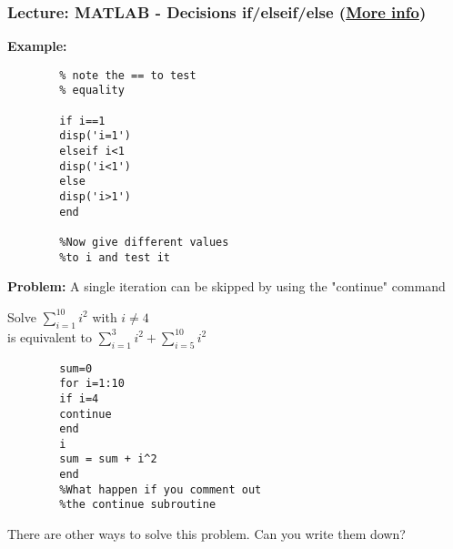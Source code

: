 \documentclass[11pt]{beamer}
\begin{document}
\begin{frame}[fragile]
	
	\frametitle{Lecture: MATLAB - Decisions if/elseif/else
		(\href{http://www.mathworks.com/help/matlab/ref/if.html}{More info})}
	\vspace{-5pt}	
	\begin{minipage}[t]{0.47\linewidth}
		\textbf{Example:}
		\begin{verbatim}
		% note the == to test 
		% equality
		
		if i==1 
		disp('i=1')
		elseif i<1
		disp('i<1')
		else
		disp('i>1')
		end
		
		%Now give different values 
		%to i and test it
		\end{verbatim}
	\end{minipage}
	\begin{minipage}[t]{0.47\linewidth}
		\textbf{Problem:}
		A single iteration can be skipped by using the "continue" command
		
		Solve $\sum_{i=1}^{10}i^2$ with $i\neq 4$\\
		is equivalent to $\sum_{i=1}^{3}i^2+\sum_{i=5}^{10}i^2$
		\begin{verbatim}
		sum=0
		for i=1:10
		if i=4
		continue
		end
		i   
		sum = sum + i^2
		end
		%What happen if you comment out
		%the continue subroutine
		\end{verbatim}	
		\vspace{-5mm}
	\end{minipage}
	
		\begin{exampleblock}{}
			There are other ways to solve this problem. Can you write them down?
		\end{exampleblock}	
	
\end{frame}




\end{document}
